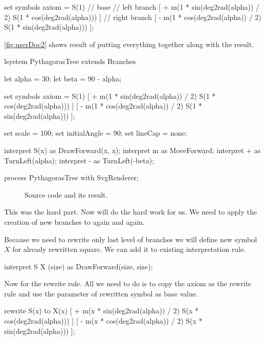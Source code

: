\begin{Lsystem}
set symbols axiom = S(1) // base
	 // left branch
	[ + m(1 * sin(deg2rad(alpha)) / 2) S(1 * cos(deg2rad(alpha))) ]
	 // right branch
	[ - m(1 * cos(deg2rad(alpha)) / 2) S(1 * sin(deg2rad(alpha))) ];
\end{Lsystem}

\autoref{fig:userDoc2} shows result of putting everything together along with the result.

\newsavebox{\lstBoxUserDocB}
\begin{lrbox}{\lstBoxUserDocB}
\begin{Lsystem60}
lsystem PythagorasTree extends Branches{
	let alpha = 30;
	let beta = 90 - alpha;

	set symbols axiom = S(1)
	[ + m(1 * sin(deg2rad(alpha)) / 2)
		S(1 * cos(deg2rad(alpha))) ]
	[ - m(1 * cos(deg2rad(alpha)) / 2) 
		S(1 * sin(deg2rad(alpha))) ];
	
	set scale = 100;
	set initialAngle = 90;
	set lineCap = none;
	
	interpret S(x) as DrawForward(x, x);
	interpret m as MoveForward;
	interpret + as TurnLeft(alpha);
	interpret - as TurnLeft(-beta);
}
process PythagorasTree with SvgRenderer;
\end{Lsystem60}
\end{lrbox}

\begin{figure}[h!]
	\subfloat{
		\usebox{\lstBoxUserDocB}
	} \hfill
	\caption{Source code and its result.}
	\label{fig:userDoc2}
\end{figure}

This was the hard part.
Now \lsystems will do the hard work for us.
We need to apply the creation of new branches to again and again.

Because we need to rewrite only last level of branches we will define new symbol $X$ for already rewritten square.
We can add it to existing interpretation rule.

\begin{Lsystem}
interpret S X (size) as DrawForward(size, size);
\end{Lsystem}

Now for the rewrite rule.
All we need to do is to copy the axiom as the rewrite rule and use the parameter of rewritten symbol as base value.

\begin{Lsystem}
rewrite S(x) to X(x)
	[ + m(x * sin(deg2rad(alpha)) / 2) S(x * cos(deg2rad(alpha))) ]
	[ - m(x * cos(deg2rad(alpha)) / 2) S(x * sin(deg2rad(alpha))) ];
\end{Lsystem}

